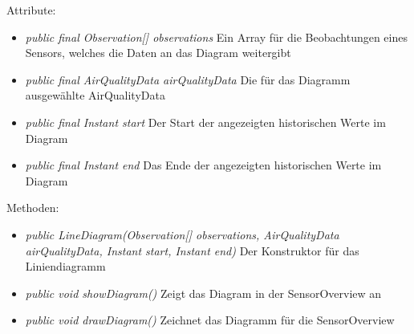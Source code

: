 Attribute:
\begin{itemize}
    \item \emph{public final Observation[] observations} Ein Array für die Beobachtungen eines Sensors, welches die Daten an das Diagram weitergibt
    \item \emph{public final AirQualityData airQualityData} Die für das Diagramm ausgewählte AirQualityData
    \item \emph{public final Instant start} Der Start der angezeigten historischen Werte im Diagram
    \item \emph{public final Instant end} Das Ende der angezeigten historischen Werte im Diagram
\end{itemize}
Methoden:
\begin{itemize}
    \item \emph{public LineDiagram(Observation[] observations, AirQualityData airQualityData, Instant start, Instant end)} Der Konstruktor für das Liniendiagramm
    \item \emph{public void showDiagram()} Zeigt das Diagram in der SensorOverview an
    \item \emph{public void drawDiagram()} Zeichnet das Diagramm für die SensorOverview
\end{itemize}
